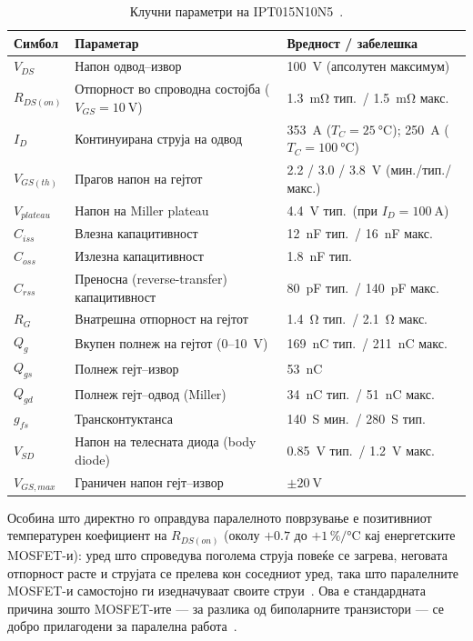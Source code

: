 \documentclass[journal,onecolumn,11pt]{IEEEtran}
\begin{document}
\begin{table}[t]
\centering
\caption{Клучни параметри на IPT015N10N5~\cite{ipt015ds}.}
\label{tab:ipt}
\small
\begin{tabularx}{\columnwidth}{@{}l L L@{}}
\toprule
\textbf{Симбол} & \textbf{Параметар} & \textbf{Вредност / забелешка} \\
\midrule
$V_{DS}$ & Напон одвод--извор & \SI{100}{\volt} (апсолутен максимум) \\
$R_{DS(on)}$ & Отпорност во спроводна состојба ($V_{GS}=\SI{10}{\volt}$) &
\SI{1.3}{\milli\ohm} тип.\ / \SI{1.5}{\milli\ohm} макс. \\
$I_D$ & Континуирана струја на одвод & \SI{353}{\ampere} ($T_C=\SI{25}{\celsius}$);
\SI{250}{\ampere} ($T_C=\SI{100}{\celsius}$) \\
$V_{GS(th)}$ & Прагов напон на гејтот & 2.2 / 3.0 / \SI{3.8}{\volt} (мин./тип./макс.) \\
$V_{plateau}$ & Напон на Miller plateau & \SI{4.4}{\volt} тип.\ (при $I_D=\SI{100}{\ampere}$) \\
$C_{iss}$ & Влезна капацитивност & \SI{12}{\nano\farad} тип.\ / \SI{16}{\nano\farad} макс. \\
$C_{oss}$ & Излезна капацитивност & \SI{1.8}{\nano\farad} тип. \\
$C_{rss}$ & Преносна (reverse-transfer) капацитивност & \SI{80}{\pico\farad} тип.\ / \SI{140}{\pico\farad} макс. \\
$R_{G}$ & Внатрешна отпорност на гејтот & \SI{1.4}{\ohm} тип.\ / \SI{2.1}{\ohm} макс. \\
$Q_{g}$ & Вкупен полнеж на гејтот (\mbox{0--\SI{10}{\volt}}) & \SI{169}{\nano\coulomb} тип.\ / \SI{211}{\nano\coulomb} макс. \\
$Q_{gs}$ & Полнеж гејт--извор & \SI{53}{\nano\coulomb} \\
$Q_{gd}$ & Полнеж гејт--одвод (Miller) & \SI{34}{\nano\coulomb} тип.\ / \SI{51}{\nano\coulomb} макс. \\
$g_{fs}$ & Трансконтуктанса & \SI{140}{\siemens} мин.\ / \SI{280}{\siemens} тип. \\
$V_{SD}$ & Напон на телесната диода (body diode) & \SI{0.85}{\volt} тип.\ / \SI{1.2}{\volt} макс. \\
$V_{GS,max}$ & Граничен напон гејт--извор & $\pm\SI{20}{\volt}$ \\
\bottomrule
\end{tabularx}
\end{table}

Особина што директно го оправдува паралелното поврзување е позитивниот температурен
коефициент на $R_{DS(on)}$ (околу $+0.7$ до $+1\,\%/\si{\celsius}$ кај енергетските
MOSFET-и): уред што спроведува поголема струја повеќе се загрева, неговата отпорност
расте и струјата се прелева кон соседниот уред, така што паралелните MOSFET-и
самостојно ги изедначуваат своите струи~\cite{balogh}. Ова е стандардната причина
зошто MOSFET-ите --- за разлика од биполарните транзистори --- се добро прилагодени
за паралелна работа~\cite{balogh}.
\end{document}
